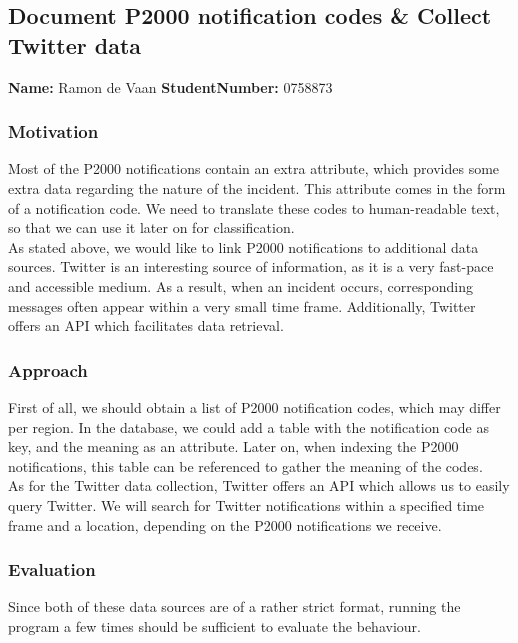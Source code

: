 \subsection{Document P2000 notification codes \& Collect Twitter data}
\textbf{Name:} Ramon de Vaan \indent \textbf{StudentNumber:} 0758873

\subsubsection*{Motivation}
Most of the P2000 notifications contain an extra attribute, which provides some extra data regarding the nature of the incident.
This attribute comes in the form of a notification code.
We need to translate these codes to human-readable text, so that we can use it later on for classification. \\

As stated above, we would like to link P2000 notifications to additional data sources.
Twitter is an interesting source of information, as it is a very fast-pace and accessible medium.
As a result, when an incident occurs, corresponding messages often appear within a very small time frame.
Additionally, Twitter offers an API which facilitates data retrieval.

\subsubsection*{Approach}
First of all, we should obtain a list of P2000 notification codes, which may differ per region.
In the database, we could add a table with the notification code as key, and the meaning as an attribute.
Later on, when indexing the P2000 notifications, this table can be referenced to gather the meaning of the codes. \\

As for the Twitter data collection, Twitter offers an API which allows us to easily query Twitter.
We will search for Twitter notifications within a specified time frame and a location, depending on the P2000 notifications we receive.

\subsubsection*{Evaluation }
Since both of these data sources are of a rather strict format, running the program a few times should be sufficient to evaluate the behaviour. 